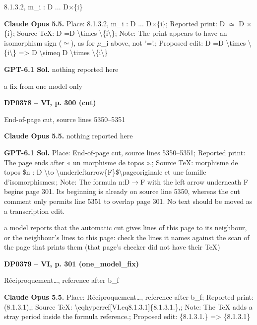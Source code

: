 8.1.3.2, m\_i : D ... D\ensuremath{\times}\{i\}\par
\textbf{Claude Opus 5.5.} Place: 8.1.3.2, m\_i : D ... D\ensuremath{\times}\{i\}; Reported print: D \ensuremath{\simeq} D \ensuremath{\times}\{i\}; Source TeX: D =\allowbreak  D \textbackslash{}times \textbackslash{}\{i\textbackslash{}\}; Note: The print appears to have an isomorphism sign (\ensuremath{\simeq}), as for \ensuremath{\mu}\_i above, not '=\allowbreak '.; Proposed edit: D =\allowbreak  D \textbackslash{}times \textbackslash{}\{i\textbackslash{}\} =\allowbreak > D \textbackslash{}simeq D \textbackslash{}times \textbackslash{}\{i\textbackslash{}\}\par
\textbf{GPT-6.1 Sol.} nothing reported here\par
a fix from one model only\par
\par\noindent\hypertarget{DP0378}{}\textbf{DP0378 -- VI, p. 300 (cut)}\par
End-of-page cut, source lines 5350–5351\par
\textbf{Claude Opus 5.5.} nothing reported here\par
\textbf{GPT-6.1 Sol.} Place: End-of-page cut, source lines 5350–5351; Reported print: The page ends after « un morphisme de topos ».; Source TeX: morphisme de topos \$n : D \textbackslash{}to \textbackslash{}underleftarrow\{F\}\$\textbackslash{}pageoriginale et une famille d'isomorphismes:; Note: The formula n:D\ensuremath{\to}F with the left arrow underneath F begins page 301. Its beginning is already on source line 5350, whereas the cut comment only permits line 5351 to overlap page 301. No text should be moved as a transcription edit.\par
a model reports that the automatic cut gives lines of this page to its neighbour, or the neighbour's lines to this page: check the lines it names against the scan of the page that prints them (that page's checker did not have their TeX)\par
\par\noindent\hypertarget{DP0379}{}\textbf{DP0379 -- VI, p. 301 (one\_model\_fix)}\par
Réciproquement…, reference after b\_f\par
\textbf{Claude Opus 5.5.} Place: Réciproquement…, reference after b\_f; Reported print: (8.1.3.1),; Source TeX: \textbackslash{}eqhyperref[VI.eq8.1.3.1]\{8.1.3.1.\},; Note: The TeX adds a stray period inside the formula reference.; Proposed edit: \{8.1.3.1.\} =\allowbreak > \{8.1.3.1\}\par

